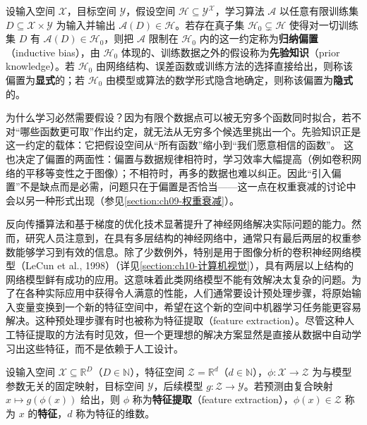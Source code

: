 \documentclass[../../main.tex]{subfiles}
\begin{document}
\begin{definition}[先验知识与归纳偏置]\label{definition:ch01-先验知识与归纳偏置}
设输入空间 $\mathcal{X}$，目标空间 $\mathcal{Y}$，假设空间 $\mathcal{H}\subseteq\mathcal{Y}^{\mathcal{X}}$，学习算法 $\mathcal{A}$ 以任意有限训练集 $D\subseteq\mathcal{X}\times\mathcal{Y}$ 为输入并输出 $\mathcal{A}(D)\in\mathcal{H}$。若存在真子集 $\mathcal{H}_{0}\subsetneq\mathcal{H}$ 使得对一切训练集 $D$ 有 $\mathcal{A}(D)\in\mathcal{H}_{0}$，则把 $\mathcal{A}$ 限制在 $\mathcal{H}_{0}$ 内的这一约定称为\textbf{归纳偏置}（inductive bias），由 $\mathcal{H}_{0}$ 体现的、训练数据之外的假设称为\textbf{先验知识}（prior knowledge）。若 $\mathcal{H}_{0}$ 由网络结构、误差函数或训练方法的选择直接给出，则称该偏置为\textbf{显式}的；若 $\mathcal{H}_{0}$ 由模型或算法的数学形式隐含地确定，则称该偏置为\textbf{隐式}的。
\end{definition}

\begin{remark}
为什么学习必然需要假设？因为有限个数据点可以被无穷多个函数同时拟合，若不对“哪些函数更可取”作出约定，就无法从无穷多个候选里挑出一个。先验知识正是这一约定的载体：它把假设空间从“所有函数”缩小到“我们愿意相信的函数”。
这也决定了偏置的两面性：偏置与数据规律相符时，学习效率大幅提高（例如卷积网络的平移等变性之于图像）；不相符时，再多的数据也难以纠正。因此“引入偏置”不是缺点而是必需，问题只在于偏置是否恰当——这一点在权重衰减的讨论中会以另一种形式出现（参见\cref{section:ch09-权重衰减}）。
\end{remark}

反向传播算法和基于梯度的优化技术显著提升了神经网络解决实际问题的能力。然而，研究人员注意到，在具有多层结构的神经网络中，通常只有最后两层的权重参数能够学习到有效的信息。除了少数例外，特别是用于图像分析的卷积神经网络模型（LeCun et al., 1998）（详见\cref{section:ch10-计算机视觉}），具有两层以上结构的网络模型鲜有成功的应用。这意味着此类网络模型不能有效解决太复杂的问题。为了在各种实际应用中获得令人满意的性能，人们通常要设计预处理步骤，将原始输入变量变换到一个新的特征空间中，希望在这个新的空间中机器学习任务能更容易解决。这种预处理步骤有时也被称为特征提取（feature extraction）。尽管这种人工特征提取的方法有时见效，但一个更理想的解决方案显然是直接从数据中自动学习出这些特征，而不是依赖于人工设计。

\begin{definition}[特征提取]\label{definition:ch01-特征提取}
设输入空间 $\mathcal{X}\subseteq\mathbb{R}^{D}$（$D\in\mathbb{N}$），特征空间 $\mathcal{Z}=\mathbb{R}^{d}$（$d\in\mathbb{N}$），$\phi:\mathcal{X}\to\mathcal{Z}$ 为与模型参数无关的固定映射，目标空间 $\mathcal{Y}$，后续模型 $g:\mathcal{Z}\to\mathcal{Y}$。若预测由复合映射 $x\mapsto g(\phi(x))$ 给出，则 $\phi$ 称为\textbf{特征提取}（feature extraction），$\phi(x)\in\mathcal{Z}$ 称为 $x$ 的\textbf{特征}，$d$ 称为特征的维数。
\end{definition}
\end{document}
